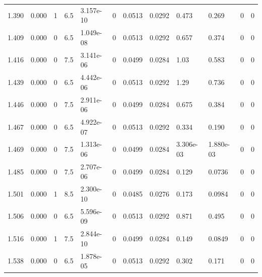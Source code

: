 \documentclass[preview]{standalone}
\begin{document}
{{{\begin{tabular}{L{1.2cm}C{1.2cm} C{0.3cm}C{0.5cm} C{1.4cm}C{1.4cm} C{1.4cm}C{1.4cm} C{1.6cm}C{1.6cm} C{1.6cm}C{1.6cm}}
  1.390  &  0.000  & 1     & 6.5 &  3.157e-10  & 0  &  0.0513&   0.0292& 0.473 & 0.269   &  0 & 0  \\ 
  1.409  &  0.000  & 0     & 6.5 &  1.049e-08  & 0  &  0.0513&   0.0292& 0.657 & 0.374   &  0 & 0  \\ 
  1.416  &  0.000  & 0     & 7.5 &  3.141e-06  & 0  &  0.0499&   0.0284& 1.03 & 0.583   &  0 & 0  \\ 
  1.439  &  0.000  & 0     & 6.5 &  4.442e-06  & 0  &  0.0513&   0.0292& 1.29 & 0.736   &  0 & 0  \\ 
  1.446  &  0.000  & 0     & 7.5 &  2.911e-06  & 0  &  0.0499&   0.0284& 0.675 & 0.384   &  0 & 0  \\ 
  1.467  &  0.000  & 0     & 6.5 &  4.922e-07  & 0  &  0.0513&   0.0292& 0.334 & 0.190   &  0 & 0  \\ 
  1.469  &  0.000  & 0     & 7.5 &  1.313e-06  & 0  &  0.0499&   0.0284& 3.306e-03 & 1.880e-03   &  0 & 0  \\ 
  1.485  &  0.000  & 0     & 7.5 &  2.707e-06  & 0  &  0.0499&   0.0284& 0.129 & 0.0736   &  0 & 0  \\ 
  1.501  &  0.000  & 1     & 8.5 &  2.300e-10  & 0  &  0.0485&   0.0276& 0.173 & 0.0984   &  0 & 0  \\ 
  1.506  &  0.000  & 0     & 6.5 &  5.596e-09  & 0  &  0.0513&   0.0292& 0.871 & 0.495   &  0 & 0  \\ 
  1.516  &  0.000  & 1     & 7.5 &  2.844e-10  & 0  &  0.0499&   0.0284& 0.149 & 0.0849   &  0 & 0  \\ 
  1.538  &  0.000  & 0     & 6.5 &  1.878e-05  & 0  &  0.0513&   0.0292& 0.302 & 0.171   &  0 & 0  \\ 
\hline 
\end{tabular} 

}}}
\end{document}
